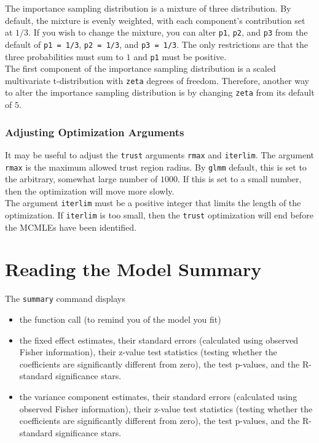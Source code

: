 \documentclass[11pt]{article}\usepackage[]{graphicx}\usepackage[]{color}
\begin{document}
The importance sampling distribution is a mixture of three distribution. By default, the mixture is evenly weighted, with each component's contribution set at $1/3$. If you wish to change the mixture, you can alter \texttt{p1}, \texttt{p2}, and \texttt{p3} from the default of  \texttt{p1 = 1/3}, \texttt{p2 = 1/3}, and \texttt{p3 = 1/3}. The only restrictions are that the three probabilities must sum to $1$ and \texttt{p1} must be positive.\\

 The first component of the importance sampling distribution is a scaled multivariate t-distribution with \texttt{zeta} degrees of freedom. Therefore, another way to alter the importance sampling distribution is by changing \texttt{zeta} from its default of $5$.\\

\subsubsection{Adjusting Optimization Arguments}
It may be useful to adjust the \texttt{trust} arguments \texttt{rmax} and \texttt{iterlim}. The argument \texttt{rmax} is the maximum allowed trust region radius. By \texttt{glmm} default, this is set to the arbitrary, somewhat large number of $1000$. If this is set to a small number, then the optimization will move more slowly.\\

The argument \texttt{iterlim} must be a positive integer that limits the length of the optimization. If \texttt{iterlim} is too small, then the \texttt{trust} optimization will end before the MCMLEs have been identified.\\

\section{Reading the Model Summary}\label{sec:summary}

The \texttt{summary} command displays
\begin{itemize}
\item the function call (to remind you of the model you fit)
\item the fixed effect estimates, their standard errors (calculated using observed Fisher information), their z-value test statistics (testing whether the coefficients are significantly different from zero), the test p-values, and the R-standard significance stars.
\item the variance component estimates, their standard errors (calculated using observed Fisher information), their z-value test statistics (testing whether the coefficients are significantly different from zero), the test p-values, and the R-standard significance stars.
\end{itemize}
\end{document}
